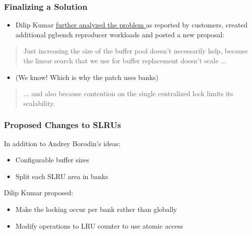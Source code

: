 \begin{frame}
  \frametitle{Finalizing a Solution}
  \begin{itemize}
    \item Dilip Kumar
      \href{https://postgr.es/m/CAFiTN-vzDvNz=ExGXz6gdyjtzGixKSqs0mKHMmaQ8sOSEFZ33A@mail.gmail.com}
      {further analyzed the problem \faExternalLink} as reported by customers, created
      additional pgbench reproducer workloads and posted a new proposal:
  \end{itemize}
  \begin{quote}
    \linksize Just increasing the size of the buffer pool doesn't necessarily help,
    because the linear search that we use for buffer replacement doesn't scale ...
  \end{quote}
  \begin{itemize}
    \item (We know!  Which is why the patch uses banks)
  \end{itemize}
  \begin{quote}
    \linksize
    ... and also because contention on the single centralized lock
    limits its scalability.
  \end{quote}
\end{frame}

\begin{frame}
  \frametitle{Proposed Changes to SLRUs}
  In addition to Andrey Borodin's ideas:
  \begin{itemize}
    \item Configurable buffer sizes
    \item Split each SLRU area in banks
  \end{itemize}

  Dilip Kumar proposed:
  \begin{itemize}
    \item Make the locking occur per bank rather than globally
    \item Modify operations to LRU counter to use atomic access
  \end{itemize}
\end{frame}

